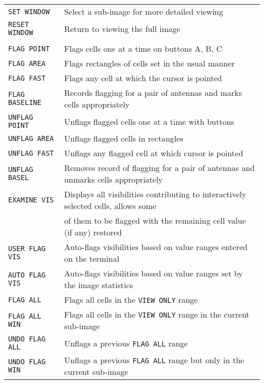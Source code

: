 \documentclass[twoside]{article}
\begin{document}
\begin{center}
\begin{tabular}{|l|l|}\hline
 {\tt SET WINDOW     } & Select a sub-image for more detailed viewing \\
 {\tt RESET WINDOW   } & Return to viewing the full image \\
 {\tt                } & \\
 {\tt FLAG POINT     } & Flags cells one at a time on buttons A, B, C \\
 {\tt FLAG AREA      } & Flags rectangles of cells set in the usual
                         manner \\
 {\tt FLAG FAST      } & Flags any cell at which the cursor is
                         pointed \\
 {\tt FLAG BASELINE  } & Records flagging for a pair of antennas and
                         marks cells appropriately \\
 {\tt UNFLAG POINT   } & Unflags flagged cells one at a time with
                         buttons \\
 {\tt UNFLAG AREA    } & Unflags flagged cells in rectangles\\
 {\tt UNFLAG FAST    } & Unflags any flagged cell at which cursor is
                         pointed\\
 {\tt UNFLAG BASEL   } & Removes record of flagging for a pair of
                         antennas and unmarks cells appropriately\\
 {\tt EXAMINE VIS    } & Displays all visibilities contributing to
                         interactively selected cells, allows some\\
 {\tt                } & of them to be flagged with the remaining
                         cell value (if any) restored\\
 {\tt USER FLAG VIS  } & Auto-flags visibilities based on value ranges
                         entered on the terminal\\
 {\tt AUTO FLAG VIS  } & Auto-flags visibilities based on value ranges
                         set by the image statistics \\
 {\tt FLAG ALL       } & Flags all cells in the {\tt VIEW ONLY} range \\
 {\tt FLAG ALL WIN   } & Flags all cells in the {\tt VIEW ONLY} range
                         in the current sub-image\\
 {\tt UNDO FLAG ALL  } & Unflags a previous {\tt FLAG ALL} range\\
 {\tt UNDO FLAG WIN  } & Unflags a previous {\tt FLAG ALL} range but
                         only in the current sub-image \\ \hline
\end{tabular}
\end{center}
\end{document}
